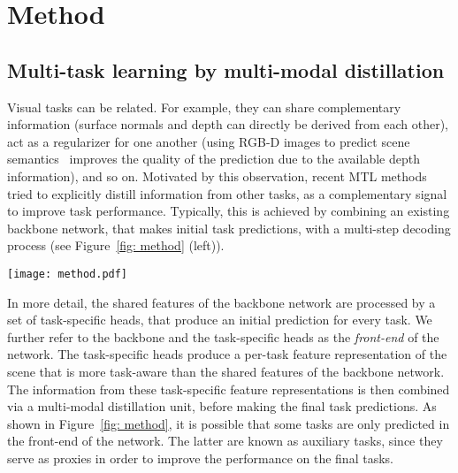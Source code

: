 \documentclass[runningheads]{llncs}
\begin{document}
\section{Method}
\label{sec: method}

\subsection{Multi-task learning by multi-modal distillation}
\label{subsec: multi_modal_distillation}
Visual tasks can be related. For example, they can share complementary information (surface normals and depth can directly be derived from each other), act as a regularizer for one another (using RGB-D images to predict scene semantics~\cite{gupta2014learning} improves the quality of the prediction due to the available depth information), and so on. Motivated by this observation, recent MTL methods~\cite{xu2018pad,zhang2018joint,zhang2019pattern} tried to explicitly distill information from other tasks, as a complementary signal to improve task performance. Typically, this is achieved by combining an existing backbone network, that makes initial task predictions, with a multi-step decoding process (see Figure~\ref{fig: method} (left)).

\begin{figure*}[t]
\centering
\texttt{[image: method.pdf]}
\caption{An overview of different MTL architectures as described in Section~\ref{sec: method}. \textbf{(Left)} The architecture used in \textbf{PAD-Net}~\cite{xu2018pad} and PAP-Net~\cite{zhang2019pattern}. Features extracted from a backbone network are used to make initial task predictions. The task features are combined through a distillation unit before making the final task predictions. \textbf{(Right)} The architecture of the proposed \textbf{MTI-Net}. Starting from a backbone that extracts multi-scale features, initial task predictions are made at each scale. The task features are distilled separately at every scale, allowing our model to capture task interactions at multiple scales, i.e. receptive fields. After distillation, the distilled task features from all scales are aggregated to make the final task predictions. To boost performance, we extend our model with a feature propagation mechanism that passes distilled information from lower resolution task features to higher ones.}
\label{fig: method}
\end{figure*}

In more detail, the shared features of the backbone network are processed by a set of task-specific heads, that produce an initial prediction for every task. We further refer to the backbone and the task-specific heads as the \textit{front-end} of the network. The task-specific heads produce a per-task feature representation of the scene that is more task-aware than the shared features of the backbone network. The information from these task-specific feature representations is then combined via a multi-modal distillation unit, before making the final task predictions. As shown in Figure~\ref{fig: method}, it is possible that some tasks are only predicted in the front-end of the network. The latter are known as auxiliary tasks, since they serve as proxies in order to improve the performance on the final tasks. 
\end{document}
